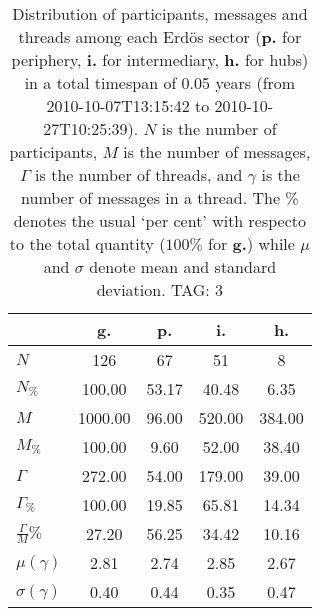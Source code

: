 \begin{table}[h!]
\begin{center}
\begin{tabular}{| l | c | c | c | c |}\hline
 & g. & p. & i. & h. \\\hline
$N$ & 126  & 67  & 51  & 8 \\\hline
$N_{\%}$ & 100.00  & 53.17  & 40.48  & 6.35 \\\hline
$M$ & 1000.00  & 96.00  & 520.00  & 384.00 \\\hline
$M_{\%}$ & 100.00  & 9.60  & 52.00  & 38.40 \\\hline
$\Gamma$ & 272.00  & 54.00  & 179.00  & 39.00 \\\hline
$\Gamma_{\%}$ & 100.00  & 19.85  & 65.81  & 14.34 \\\hline
$\frac{\Gamma}{M}\%$ & 27.20  & 56.25  & 34.42  & 10.16 \\\hline
$\mu(\gamma)$ & 2.81  & 2.74  & 2.85  & 2.67 \\\hline
$\sigma(\gamma)$ & 0.40  & 0.44  & 0.35  & 0.47 \\\hline
\end{tabular}
\caption{Distribution of participants, messages and threads among each Erd\"os sector ({\bf p.} for periphery, {\bf i.} for intermediary, 
    {\bf h.} for hubs) in a total timespan of 0.05 years (from 2010-10-07T13:15:42 to 2010-10-27T10:25:39). $N$ is the number of participants, $M$ is the number of messages, $\Gamma$ is the number of threads, and $\gamma$ is the number of messages in a thread.
    The \% denotes the usual `per cent' with respecto to the total quantity ($100\%$ for {\bf g.})
    while $\mu$ and $\sigma$ denote mean and standard deviation. TAG: 3}
\end{center}
\end{table}